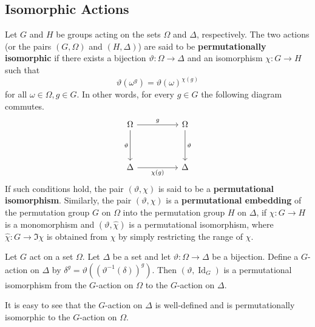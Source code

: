\subsection{Isomorphic Actions}
\begin{definition}
	Let $G$ and $H$ be groups acting on the sets $\Omega$ and $\Delta$, respectively. The two actions (or the pairs $(G,\Omega)$ and $(H,\Delta)$) are said to be \textbf{permutationally isomorphic} if there exists a bijection $\vartheta: \Omega \to \Delta$ and an isomorphism $\chi: G \to H$ such that
	\[ \vartheta(\omega^g) = \vartheta(\omega)^{\chi(g)} \]
	for all  $\omega \in \Omega, g \in G$. In other words, for every $g\in G$ the following diagram commutes.
	\[\begin{tikzcd}
		\Omega && \Omega \\
		\\
		\Delta && \Delta
		\arrow["g", from=1-1, to=1-3]
		\arrow["\vartheta"', from=1-1, to=3-1]
		\arrow["\vartheta", from=1-3, to=3-3]
		\arrow["{\chi(g)}"', from=3-1, to=3-3]
	\end{tikzcd}\]
	If such conditions hold, the pair $(\vartheta, \chi)$ is said to be a \textbf{permutational isomorphism}. Similarly, the pair $(\vartheta, \chi)$ is a \textbf{permutational embedding} of the permutation group $G$ on $\Omega$ into the permutation group $H$ on $\Delta$, if $\chi: G \to H$ is a monomorphism and $(\vartheta, \hat{\chi})$ is a permutational isomorphism, where $\hat{\chi}: G \to \Im \chi$ is obtained from $\chi$ by simply restricting the range of $\chi$.
\end{definition}


\begin{proposition}
	Let $G$ act on a set $\Omega$. Let $\Delta$ be a set and let $\vartheta: \Omega \to \Delta$ be a bijection. Define a $G$-action on $\Delta$ by $\delta^g = \vartheta((\vartheta^{-1}(\delta))^g)$. Then $(\vartheta, \operatorname{Id}_G)$ is a permutational isomorphism from the $G$-action on $\Omega$ to the $G$-action on $\Delta$.
\end{proposition}

\begin{sketch}
	It is easy to see that the $G$-action on $\Delta$ is well-defined and is permutationally isomorphic to the $G$-action on $\Omega$. 
\end{sketch}


